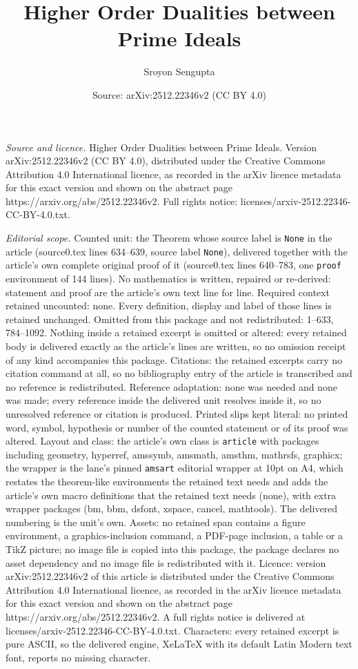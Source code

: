 \documentclass[10pt,a4paper]{amsart}
\title[Higher Order Dualities between Prime Ideals]{Higher Order Dualities between Prime Ideals}
\author{Sroyon Sengupta}
\date{Source: arXiv:2512.22346v2 (CC BY 4.0)}
\begin{document}
\maketitle

\noindent\emph{Source and licence.} Higher Order Dualities between Prime Ideals. Version arXiv:2512.22346v2 (CC BY 4.0), distributed under the Creative Commons Attribution 4.0 International licence, as recorded in the arXiv licence metadata for this exact version and shown on the abstract page https://arxiv.org/abs/2512.22346v2. Full rights notice: licenses/arxiv-2512.22346-CC-BY-4.0.txt.\par\smallskip

\noindent\textit{Editorial scope.} Counted unit: the Theorem whose source label is \texttt{None} in the article (source0.tex lines 634--639, source label \texttt{None}), delivered together with the article's own complete original proof of it (source0.tex lines 640--783, one \texttt{proof} environment of 144 lines). No mathematics is written, repaired or re-derived: statement and proof are the article's own text line for line. Required context retained uncounted: none. Every definition, display and label of those lines is retained unchanged. Omitted from this package and not redistributed: 1--633, 784--1092. Nothing inside a retained excerpt is omitted or altered: every retained body is delivered exactly as the article's lines are written, so no omission receipt of any kind accompanies this package. Citations: the retained excerpts carry no citation command at all, so no bibliography entry of the article is transcribed and no reference is redistributed. Reference adaptation: none was needed and none was made; every reference inside the delivered unit resolves inside it, so no unresolved reference or citation is produced. Printed slips kept literal: no printed word, symbol, hypothesis or number of the counted statement or of its proof was altered. Layout and class: the article's own class is \texttt{article} with packages including geometry, hyperref, amssymb, amsmath, amsthm, mathrsfs, graphicx; the wrapper is the lane's pinned \texttt{amsart} editorial wrapper at 10pt on A4, which restates the theorem-like environments the retained text needs and adds the article's own macro definitions that the retained text needs (none), with extra wrapper packages (bm, bbm, dsfont, xspace, cancel, mathtools). The delivered numbering is the unit's own. Assets: no retained span contains a figure environment, a graphics-inclusion command, a PDF-page inclusion, a table or a TikZ picture; no image file is copied into this package, the package declares no asset dependency and no image file is redistributed with it. Licence: version arXiv:2512.22346v2 of this article is distributed under the Creative Commons Attribution 4.0 International licence, as recorded in the arXiv licence metadata for this exact version and shown on the abstract page https://arxiv.org/abs/2512.22346v2. A full rights notice is delivered at licenses/arxiv-2512.22346-CC-BY-4.0.txt. Characters: every retained excerpt is pure ASCII, so the delivered engine, XeLaTeX with its default Latin Modern text font, reports no missing character.
\end{document}
